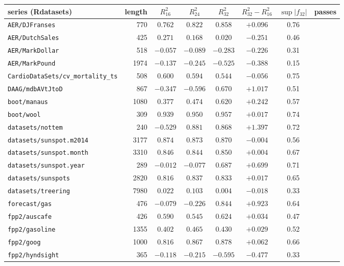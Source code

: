 \begin{tabular}{lrcccccc}\toprule
series (Rdatasets) & length & $R^2_{16}$ & $R^2_{24}$ & $R^2_{32}$ & $R^2_{32}-R^2_{16}$ & $\sup|f_{32}|$ & passes \\\midrule
\texttt{AER/DJFranses} & 770 & $0.762$ & $0.822$ & $0.858$ & $+0.096$ & 0.76 &  \\
\texttt{AER/DutchSales} & 425 & $0.271$ & $0.168$ & $0.020$ & $-0.251$ & 0.46 &  \\
\texttt{AER/MarkDollar} & 518 & $-0.057$ & $-0.089$ & $-0.283$ & $-0.226$ & 0.31 &  \\
\texttt{AER/MarkPound} & 1974 & $-0.137$ & $-0.245$ & $-0.525$ & $-0.388$ & 0.15 &  \\
\texttt{CardioDataSets/cv\_mortality\_ts} & 508 & $0.600$ & $0.594$ & $0.544$ & $-0.056$ & 0.75 &  \\
\texttt{DAAG/mdbAVtJtoD} & 867 & $-0.347$ & $-0.596$ & $0.670$ & $+1.017$ & 0.51 &  \\
\texttt{boot/manaus} & 1080 & $0.377$ & $0.474$ & $0.620$ & $+0.242$ & 0.57 &  \\
\texttt{boot/wool} & 309 & $0.939$ & $0.950$ & $0.957$ & $+0.017$ & 0.74 &  \\
\texttt{datasets/nottem} & 240 & $-0.529$ & $0.881$ & $0.868$ & $+1.397$ & 0.72 &  \\
\texttt{datasets/sunspot.m2014} & 3177 & $0.874$ & $0.873$ & $0.870$ & $-0.004$ & 0.56 &  \\
\texttt{datasets/sunspot.month} & 3310 & $0.846$ & $0.844$ & $0.850$ & $+0.004$ & 0.67 &  \\
\texttt{datasets/sunspot.year} & 289 & $-0.012$ & $-0.077$ & $0.687$ & $+0.699$ & 0.71 &  \\
\texttt{datasets/sunspots} & 2820 & $0.816$ & $0.837$ & $0.833$ & $+0.017$ & 0.65 &  \\
\texttt{datasets/treering} & 7980 & $0.022$ & $0.103$ & $0.004$ & $-0.018$ & 0.33 &  \\
\texttt{forecast/gas} & 476 & $-0.079$ & $-0.226$ & $0.844$ & $+0.923$ & 0.64 &  \\
\texttt{fpp2/auscafe} & 426 & $0.590$ & $0.545$ & $0.624$ & $+0.034$ & 0.47 &  \\
\texttt{fpp2/gasoline} & 1355 & $0.402$ & $0.465$ & $0.430$ & $+0.029$ & 0.52 &  \\
\texttt{fpp2/goog} & 1000 & $0.816$ & $0.867$ & $0.878$ & $+0.062$ & 0.66 &  \\
\texttt{fpp2/hyndsight} & 365 & $-0.118$ & $-0.215$ & $-0.595$ & $-0.477$ & 0.33 &  \\

\end{tabular}
